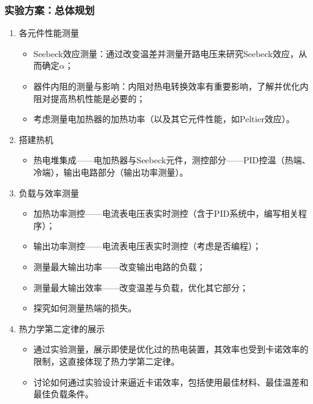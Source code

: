 \documentclass[aspectratio=169]{beamer}
\begin{document}
	
	\begin{frame}[allowframebreaks]
		\frametitle{实验方案：总体规划}
		
		\begin{enumerate}
			\item 各元件性能测量
			\begin{itemize}
				\item \textcolor{c4}{Seebeck效应测量}：通过改变温差并测量开路电压来研究Seebeck效应，从而确定$\alpha$；
				\item 器件内阻的测量与影响：内阻对热电转换效率有重要影响，了解并优化内阻对提高热机性能是必要的；
				\item 考虑测量电加热器的加热功率（以及其它元件性能，如Peltier效应）。
			\end{itemize}
			
			\item \textcolor{c4}{搭建热机}
				\begin{itemize}
					\item \textcolor{c4}{热电堆集成——电加热器与Seebeck元件，测控部分——PID控温（热端、冷端），输出电路部分（输出功率测量）。}
				\end{itemize}
			
			\item 负载与效率测量
			\begin{itemize}
				\item \textcolor{c4}{加热功率测控}——电流表电压表实时测控（含于PID系统中，编写相关程序）；
				\item \textcolor{c4}{输出功率测控}——电流表电压表实时测控（考虑是否编程）；
				\item 测量最大输出功率——改变输出电路的负载；
				\item 测量最大输出效率——改变温差与负载，优化其它部分；
				\item 探究如何测量热端的损失。
			\end{itemize}
			
			\item 热力学第二定律的展示
			\begin{itemize}
				\item \textcolor{c4}{通过实验测量，展示即使是优化过的热电装置，其效率也受到卡诺效率的限制，这直接体现了热力学第二定律。}
				\item 讨论如何通过实验设计来逼近卡诺效率，包括使用最佳材料、最佳温差和最佳负载条件。
			\end{itemize}			
			

\end{enumerate}
\end{frame}
\end{document}
